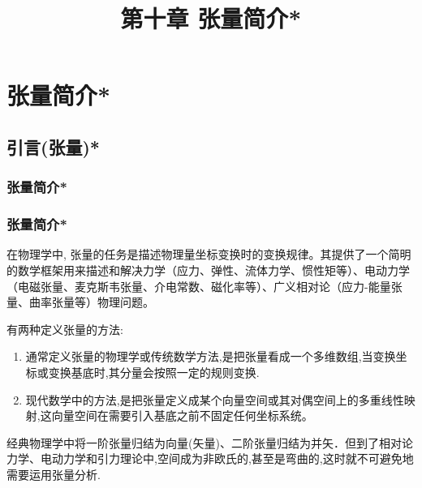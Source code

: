 \makeatletter
\ifodd\value{page}
\else
\begin{frame}[plain]
\end{frame}
\fi
\makeatother


\section{张量简介*}


\title{第十章 \quad 张量简介*}
\author{}
\date{}

\frame{\titlepage}

\subsection{引言(张量)*}

\subsubsection{张量简介*}
\begin{frame}\frametitle{张量简介*}
在物理学中, 张量的任务是描述物理量坐标变换时的变换规律。其提供了一个简明的数学框架用来描述和解决力学（应力、弹性、流体力学、惯性矩等）、电动力学（电磁张量、麦克斯韦张量、介电常数、磁化率等）、广义相对论（应力-能量张量、曲率张量等）物理问题。

\pp
\bigskip

有两种定义张量的方法:\pp
\begin{enumerate}
\item 通常定义张量的物理学或传统数学方法,是把张量看成一个多维数组,当变换坐标或变换基底时,其分量会按照一定的规则变换.\pp
\item 现代数学中的方法,是把张量定义成某个向量空间或其对偶空间上的多重线性映射,这向量空间在需要引入基底之前不固定任何坐标系统。
\end{enumerate}\pp

\bigskip
经典物理学中将一阶张量归结为向量(矢量)、二阶张量归结为并矢．但到了相对论力学、电动力学和引力理论中,空间成为非欧氏的,甚至是弯曲的,这时就不可避免地需要运用张量分析.
\end{frame}




